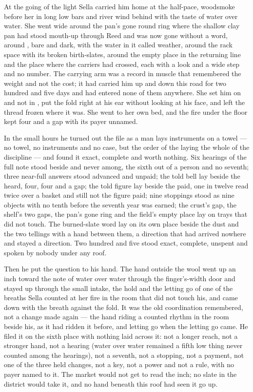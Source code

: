 \scenebreak

At the going of the light Sella carried him home at the half-pace, woodsmoke before her in long low bars and river wind behind with the taste of water over water. She went wide around the pan's gone round ring where the shallow clay pan had stood mouth-up through Reed and was now gone without a word, around , bare and dark, with the water in it called weather, around the rack space with its broken birth-slates, around the empty place in the returning line and the place where the carriers had crossed, each with a look and a wide step and no number. The carrying arm was a record in muscle that remembered the weight and not the cost; it had carried him up and down this road for two hundred and five days and had entered none of them anywhere. She set him on  and not in , put the fold right at his ear without looking at his face, and left the thread frozen where it was. She went to her own bed, and the fire under the floor kept four and a gap with its payer unnamed.

\scenebreak

In the small hours he turned out the file as a man lays instruments on a towel --- no towel, no instruments and no case, but the order of the laying the whole of the discipline --- and found it exact, complete and worth nothing. Six hearings of the full note stood beside and never among, the sixth out of a person and no seventh; three near-full answers stood advanced and unpaid; the told bell lay beside the heard, four, four and a gap; the told figure lay beside the paid, one in twelve read twice over a basket and still not the figure paid; nine stoppings stood as nine objects with no tenth before the seventh year was earned; the crust's gap, the shelf's two gaps, the pan's gone ring and the field's empty place lay on trays that did not touch. The burned-slate word lay on its own place beside the dust and the two tellings with a hand between them, a direction that had arrived nowhere and stayed a direction. Two hundred and five stood exact, complete, unspent and spoken by nobody under any roof.

Then he put the question to his hand. The hand outside the wool went up an inch toward the note of water over water through the finger's-width door and stayed up through the small intake, the hold and the letting go of one of the breaths Sella counted at her fire in the room that did not touch his, and came down with the breath against the fold. It was the old coordination remembered, not a change made again --- the hand riding a counted rhythm in the room beside his, as it had ridden it before, and letting go when the letting go came. He filed it on the sixth place with nothing laid across it: not a longer reach, not a stronger hand, not a hearing (water over water remained a fifth low thing never counted among the hearings), not a seventh, not a stopping, not a payment, not one of the three held changes, not a key, not a power and not a rule, with no payer named to it. The market would not get to read the inch; no slate in the district would take it, and no hand beneath this roof had seen it go up.

